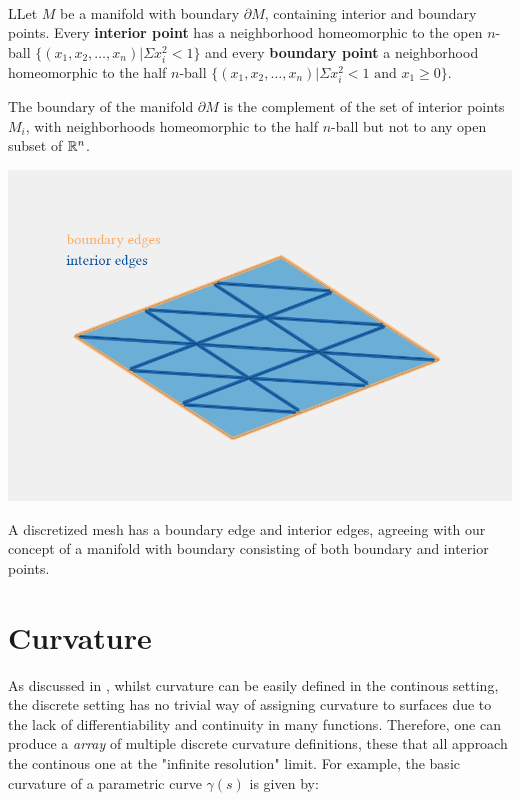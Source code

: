 \begin{definition}\\
LLet $M$ be a manifold with boundary $\partial M$, containing interior and boundary points.   Every \textbf{interior point} has a neighborhood homeomorphic to the open $n$-ball $\{(x_{1},x_{2},\dots ,x_{n})\vert \Sigma x_{i}^{2}<1\}$ 
and every \textbf{boundary point} a neighborhood homeomorphic to the half 
$n$-ball $\{(x_{1},x_{2},\dots ,x_{n})\vert \Sigma x_{i}^{2}<1{\text{ and }}x_{1}\geq 0\}$.


 The boundary of the manifold $\partial M$ is the complement of the set of interior points $M_i$, with neighborhoods homeomorphic to the half $n$-ball but not to any open subset of $\mathbb{R}^n$.   
\end{definition}




\begin{marginfigure}
    \centering
    \includegraphics[width=1.0\linewidth]{images/MeshBoundaries.png}
    \caption{A discretized mesh has a boundary edge and interior edges, agreeing with our concept of a manifold with boundary consisting of both boundary and interior points.}
\end{marginfigure}



\section{Curvature} \label{curvature}

As discussed in \cite{discreteexterior1}, whilst curvature can be
easily defined in the continous setting, the discrete setting has no
trivial way of assigning curvature to surfaces due to the lack of 
differentiability and continuity in many functions. Therefore,
one can produce a \textit{array} of multiple discrete curvature
definitions, these that all approach the continous one at the
"infinite resolution" limit. For example, the basic curvature of a 
parametric curve $\gamma(s)$ is given by:

